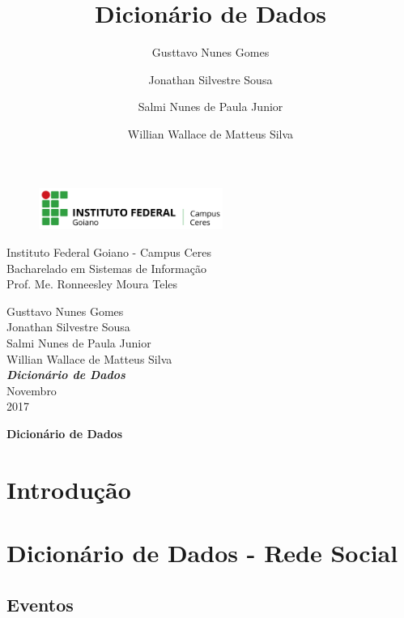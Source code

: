 \documentclass[12pt,a4paper]{article}
\title{Dicionário de Dados}
\author{Gusttavo Nunes Gomes\and Jonathan Silvestre Sousa \and Salmi Nunes de Paula Junior\and Willian Wallace de Matteus Silva}
\begin{document}
\begin{titlepage}
\begin{center}
\begin{figure}[htb]
                
                \label{figura:LogoIF}
        
                \centering
                \includegraphics[width=6cm]{recursos/imagens/logo.png} 
\end{figure}
Instituto Federal Goiano - Campus Ceres\\
Bacharelado em Sistemas de Informação\\
Prof. Me. Ronneesley Moura Teles\\\vspace{1cm}

Gusttavo Nunes Gomes\\
Jonathan Silvestre Sousa \\
Salmi Nunes de Paula Junior\\
Willian Wallace de Matteus Silva\\
\vspace{6.0cm}
\textit{\textbf{\Large{Dicionário de Dados}}}\\\vspace{11cm}
Novembro\\
2017\\
\end{center}
\end{titlepage}
\tableofcontents
\newpage
\begin{center}
\textbf{\Large{Dicionário de Dados}}\\\vspace{0.5cm}
\end{center}
\section{Introdução}

\section{Dicionário de Dados - Rede Social}
\subsection{Eventos}
\end{document}

